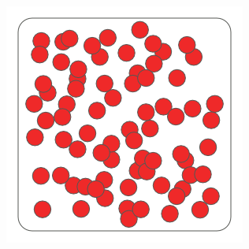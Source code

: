 \documentclass[12pt]{beamer}
\begin{document}
\begin{frame}
\begin{center}
{	\includegraphics[height=0.3\textheight]{../media/processed/population}%
}%
\end{center}
\end{frame}
\end{document}
